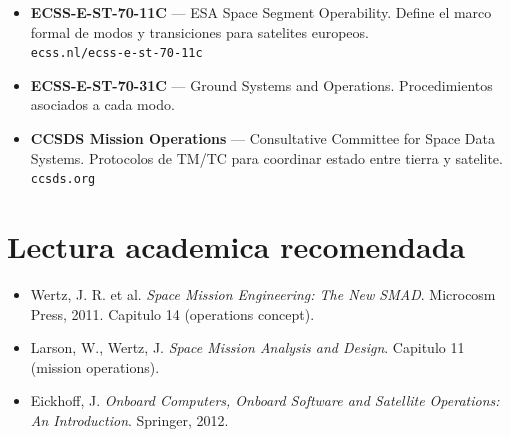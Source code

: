 \documentclass[11pt,a4paper,oneside,openright]{book}
\begin{document}
\begin{itemize}[leftmargin=2em]
  \item \textbf{ECSS-E-ST-70-11C} --- ESA Space Segment Operability.
    Define el marco formal de modos y transiciones para satelites
    europeos.\\
    \texttt{ecss.nl/ecss-e-st-70-11c}
  \item \textbf{ECSS-E-ST-70-31C} --- Ground Systems and Operations.
    Procedimientos asociados a cada modo.
  \item \textbf{CCSDS Mission Operations} --- Consultative Committee
    for Space Data Systems. Protocolos de TM/TC para coordinar
    estado entre tierra y satelite.\\
    \texttt{ccsds.org}
\end{itemize}

\section*{Lectura academica recomendada}

\begin{itemize}[leftmargin=2em]
  \item Wertz, J. R. et al. \emph{Space Mission Engineering: The New
    SMAD}. Microcosm Press, 2011. Capitulo 14 (operations concept).
  \item Larson, W., Wertz, J. \emph{Space Mission Analysis and
    Design}. Capitulo 11 (mission operations).
  \item Eickhoff, J. \emph{Onboard Computers, Onboard Software and
    Satellite Operations: An Introduction}. Springer, 2012.
\end{itemize}
\end{document}
